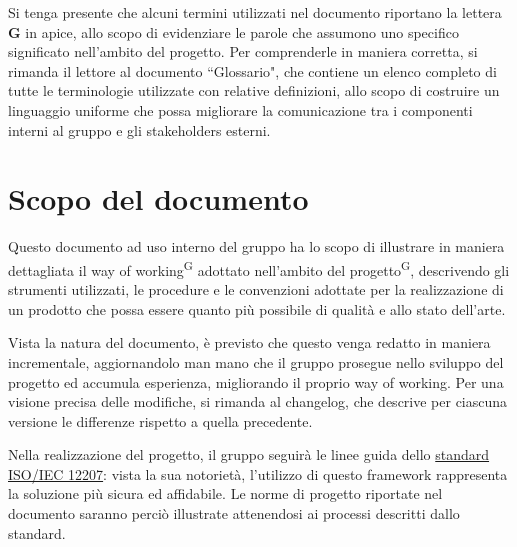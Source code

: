 \begin{beginningnote}
    Si tenga presente che alcuni termini utilizzati nel documento riportano la lettera \textbf{G} in apice, allo scopo di evidenziare le parole che assumono uno specifico significato nell'ambito del progetto. Per comprenderle in maniera corretta, si rimanda il lettore al documento ``Glossario", che contiene un elenco completo di tutte le terminologie utilizzate con relative definizioni, allo scopo di costruire un linguaggio uniforme che possa migliorare la comunicazione tra i componenti interni al gruppo e gli stakeholders esterni.   %
\end{beginningnote}

\section{Scopo del documento}\label{sec:scopo_del_documento}
\par Questo documento ad uso interno del gruppo ha lo scopo di illustrare in maniera dettagliata il way of working\textsuperscript{G} adottato nell'ambito del progetto\textsuperscript{G}, descrivendo gli strumenti utilizzati, le procedure e le convenzioni adottate per la realizzazione di un prodotto che possa essere quanto più possibile di qualità e allo stato dell'arte.
\par Vista la natura del documento, è previsto che questo venga redatto in maniera incrementale, aggiornandolo man mano che il gruppo prosegue nello sviluppo del progetto ed accumula esperienza, migliorando il proprio way of working. Per una visione precisa delle modifiche, si rimanda al changelog, che descrive per ciascuna versione le differenze rispetto a quella precedente.
\par Nella realizzazione del progetto, il gruppo seguirà le linee guida dello \hyperref[sec:standard_iso/iec_12207]{standard ISO/IEC 12207}: vista la sua notorietà, l'utilizzo di questo framework rappresenta la soluzione più sicura ed affidabile. Le norme di progetto riportate nel documento saranno perciò illustrate attenendosi ai processi descritti dallo standard.

